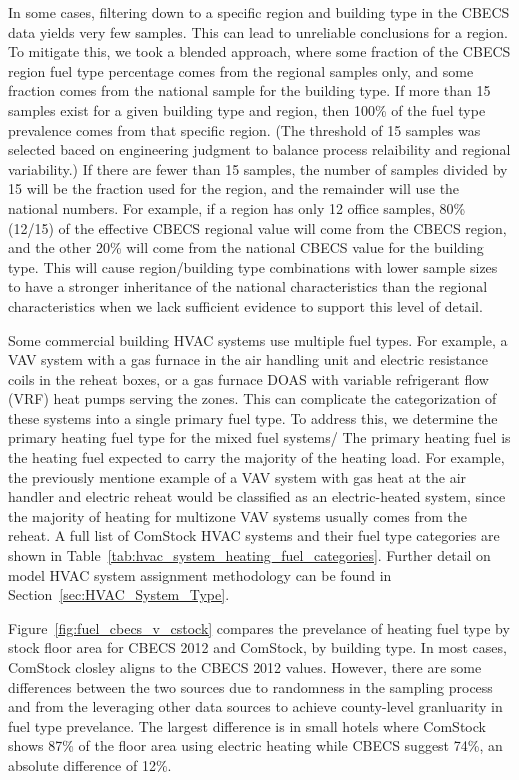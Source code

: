 In some cases, filtering down to a specific region and building type in the CBECS data yields very few samples. This can lead to unreliable conclusions for a region. To mitigate this, we took a blended approach, where some fraction of the CBECS region fuel type percentage comes from the regional samples only, and some fraction comes from the national sample for the building type. If more than 15 samples exist for a given building type and region, then 100\% of the fuel type prevalence comes from that specific region. (The threshold of 15 samples was selected baced on engineering judgment to balance process relaibility and regional variability.) If there are fewer than 15 samples, the number of samples divided by 15 will be the fraction used for the region, and the remainder will use the national numbers. For example, if a region has only 12 office samples, 80\% (12\//15) of the effective CBECS regional value will come from the CBECS region, and the other 20\% will come from the national CBECS value for the building type. This will cause region/building type combinations with lower sample sizes to have a stronger inheritance of the national characteristics than the regional characteristics when we lack sufficient evidence to support this level of detail.

Some commercial building HVAC systems use multiple fuel types. For example, a VAV system with a gas furnace in the air handling unit and electric resistance coils in the reheat boxes, or a gas furnace DOAS with variable refrigerant flow (VRF) heat pumps serving the zones. This can complicate the categorization of these systems into a single primary fuel type. To address this, we determine the primary heating fuel type for the mixed fuel systems/ The primary heating fuel is the heating fuel expected to carry the majority of the heating load. For example, the previously mentione example of a VAV system with gas heat at the air handler and electric reheat would be classified as an electric-heated system, since the majority of heating for multizone VAV systems usually comes from the reheat. A full list of ComStock HVAC systems and their fuel type categories are shown in Table~\ref{tab:hvac_system_heating_fuel_categories}. Further detail on model HVAC system assignment methodology can be found in Section~\ref{sec:HVAC_System_Type}.

Figure~\ref{fig:fuel_cbecs_v_cstock} compares the prevelance of heating fuel type by stock floor area for CBECS 2012 and ComStock, by building type. In most cases, ComStock closley aligns to the CBECS 2012 values. However, there are some differences between the two sources due to randomness in the sampling process and from the leveraging other data sources to achieve county-level granluarity in fuel type prevelance. The largest difference is in small hotels where ComStock shows 87\% of the floor area using electric heating while CBECS suggest 74\%, an absolute difference of 12\%.

